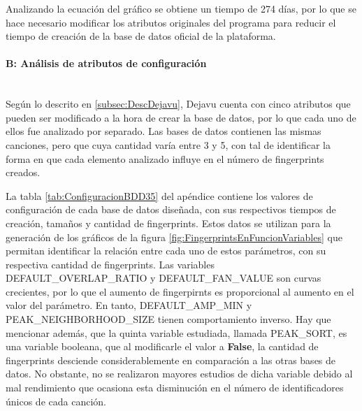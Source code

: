 Analizando la ecuación del gráfico se obtiene un tiempo de 274 días, por lo que se hace necesario modificar los atributos originales del programa para reducir el tiempo de creación de la base de datos oficial de la plataforma.

\paragraph{B: Análisis de atributos de configuración}\label{parrrafoAnalisisAtributos}\mbox{}\\

Según lo descrito en \ref{subsec:DescDejavu}, Dejavu cuenta con cinco atributos que pueden ser modificado a la hora de crear la base de datos, por lo que cada uno de ellos fue analizado por separado. Las bases de datos contienen las mismas canciones, pero que cuya cantidad varía entre  3 y 5, con tal de identificar la forma en que cada elemento analizado influye en el número de fingerprints creados.

La tabla \ref{tab:ConfiguracionBDD35} del apéndice contiene los valores de configuración de cada base de datos diseñada, con sus respectivos tiempos de creación, tamaños y cantidad de fingerprints. Estos datos se utilizan para la generación de los gráficos de la figura \ref{fig:FingerprintsEnFuncionVariables} que permitan identificar la relación entre cada uno de estos parámetros, con su respectiva cantidad de fingerprints. Las variables DEFAULT\_OVERLAP\_RATIO y DEFAULT\_FAN\_VALUE son curvas crecientes, por lo que el aumento de fingerpirnts es proporcional al aumento en el valor del parámetro. En tanto, DEFAULT\_AMP\_MIN y PEAK\_NEIGHBORHOOD\_SIZE tienen comportamiento inverso. Hay que mencionar además, que la quinta variable estudiada, llamada PEAK\_SORT, es una variable booleana, que al modificarle el valor a \textbf{False}, la cantidad de fingerprints desciende considerablemente en comparación a las otras bases de datos. No obstante, no se realizaron mayores estudios de dicha variable debido al mal rendimiento que ocasiona esta disminución en el número de identificadores únicos de cada canción.

